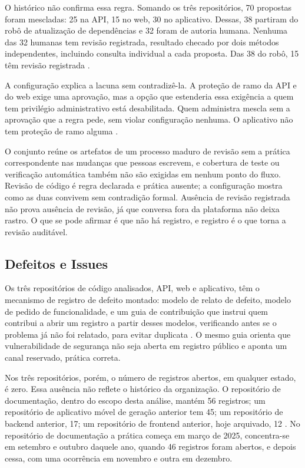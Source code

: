 O histórico não confirma essa regra. Somando os três repositórios, 70 propostas
foram mescladas: 25 na API, 15 no web, 30 no aplicativo. Dessas, 38 partiram do robô de atualização de dependências e 32 foram de autoria
humana.
Nenhuma das 32 humanas tem revisão registrada, resultado checado por dois métodos
independentes, incluindo consulta individual a cada proposta. Das 38 do robô, 15
têm revisão registrada \cite{educado-repos}.

A configuração explica a lacuna sem contradizê-la. A proteção de ramo da API e do web exige
uma aprovação, mas a opção que estenderia essa exigência a quem tem privilégio
administrativo está desabilitada. Quem administra mescla sem
a aprovação que a regra pede, sem violar configuração nenhuma. O aplicativo não tem
proteção de ramo alguma \cite{educado-repos}.

O conjunto reúne os artefatos de um processo maduro de revisão sem a prática
correspondente nas mudanças que pessoas escrevem, e cobertura de teste ou
verificação automática também não são exigidas em nenhum ponto do fluxo. Revisão
de código é regra declarada e prática ausente; a configuração mostra como as duas
convivem sem contradição formal. Ausência de revisão registrada não prova
ausência de revisão, já que conversa fora da plataforma não deixa rastro. O que
se pode afirmar é que não há registro, e registro é o que torna a revisão
auditável.


\subsection{Defeitos e Issues}

Os três repositórios de código analisados, API, web e aplicativo, têm o mecanismo
de registro de defeito montado: modelo de relato de defeito, modelo de pedido de
funcionalidade, e um guia de contribuição que instrui quem contribui a abrir um
registro a partir desses modelos, verificando antes se o problema já não foi
relatado, para evitar duplicata \cite{educado-repos}. O mesmo guia orienta que
vulnerabilidade de segurança não seja aberta em registro público e aponta um
canal reservado, prática correta.

Nos três repositórios, porém, o número de registros abertos, em qualquer estado,
é zero. Essa ausência não reflete o histórico da organização. O repositório de
documentação, dentro do escopo desta análise, mantém 56 registros; um repositório
de aplicativo móvel de geração anterior tem 45; um repositório de backend
anterior, 17; um repositório de frontend anterior, hoje arquivado, 12
\cite{educado-repos}. No repositório de documentação a prática começa em março de
2025, concentra-se em setembro e outubro daquele ano, quando 46 registros foram
abertos, e depois cessa, com uma ocorrência em novembro e outra em dezembro.

